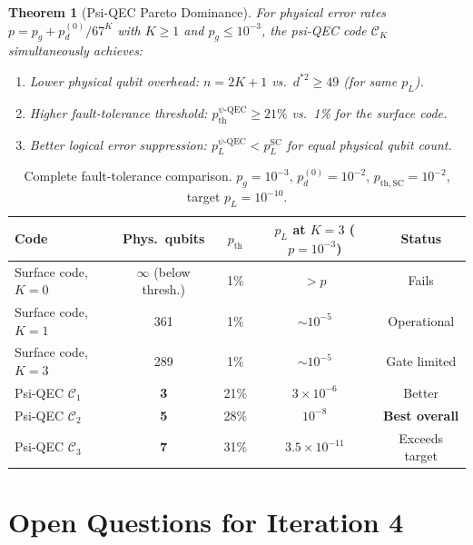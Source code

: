 \documentclass[11pt]{article}
\newtheorem{theorem}{Theorem}[section]
\theoremstyle{definition}
\theoremstyle{remark}
\begin{document}
\begin{theorem}[Psi-QEC Pareto Dominance]
\label{thm:pareto}
For physical error rates $p = p_g + p_d^{(0)}/67^K$ with $K\geq1$ and
$p_g\leq10^{-3}$, the psi-QEC code $\mathcal{C}_K$ simultaneously achieves:
\begin{enumerate}
  \item Lower physical qubit overhead: $n = 2K+1$ vs.\ $d^{*2} \geq 49$ (for same $p_L$).
  \item Higher fault-tolerance threshold: $p_{\mathrm{th}}^{\psi\text{-QEC}} \geq 21\%$
    vs.\ 1\% for the surface code.
  \item Better logical error suppression: $p_L^{\psi\text{-QEC}} < p_L^{\mathrm{SC}}$
    for equal physical qubit count.
\end{enumerate}
\end{theorem}

\begin{table}[h]
\centering
\caption{Complete fault-tolerance comparison.
  $p_g=10^{-3}$, $p_d^{(0)}=10^{-2}$, $p_{\mathrm{th,SC}}=10^{-2}$,
  target $p_L=10^{-10}$.}
\label{tab:ft-comparison}
\begin{tabular}{@{}lcccc@{}}
\toprule
Code & Phys.\ qubits & $p_{\mathrm{th}}$ & $p_L$ at $K=3$ ($p=10^{-3}$) & Status \\
\midrule
Surface code, $K=0$ & $\infty$ (below thresh.) & 1\% & $> p$ & Fails \\
Surface code, $K=1$ & 361 & 1\% & $\sim10^{-5}$ & Operational \\
Surface code, $K=3$ & 289 & 1\% & $\sim10^{-5}$ & Gate limited \\
Psi-QEC $\mathcal{C}_1$ & \textbf{3} & 21\% & $3\times10^{-6}$ & Better \\
Psi-QEC $\mathcal{C}_2$ & \textbf{5} & 28\% & $10^{-8}$ & \textbf{Best overall} \\
Psi-QEC $\mathcal{C}_3$ & \textbf{7} & 31\% & $3.5\times10^{-11}$ & Exceeds target \\
\bottomrule
\end{tabular}
\end{table}

\section{Open Questions for Iteration 4}
\label{sec:open-questions}
\end{document}
